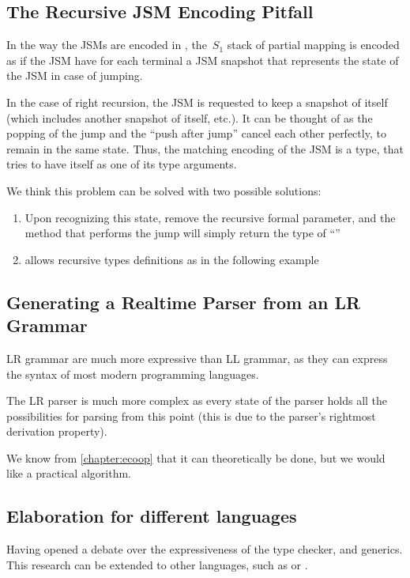 \subsection{The Recursive JSM Encoding Pitfall}
In the way the JSMs are encoded in \Java, the~$S_1$ stack of partial mapping
is encoded as if the JSM have for each terminal a JSM snapshot that represents
the state of the JSM in case of jumping. 

In the case of right recursion, the JSM is requested to keep a snapshot of
itself (which includes another snapshot of itself, etc.).  It can be thought of
as the popping of the jump and the ``push after jump'' cancel each other
perfectly, to remain in the same state.  Thus, the matching encoding of the JSM
is a type, that tries to have itself as one of its type arguments.

We think this problem can be solved with two possible solutions:
\begin{enumerate}
  \item Upon recognizing this state, remove the recursive formal parameter, and the method
    that performs the jump will simply return the type of ``''
  \item \Java allows recursive types definitions as in the following example 
    \begin{quote}
    \end{quote}
\end{enumerate}

\subsection{Generating a Realtime Parser from an LR Grammar}
LR grammar are much more expressive than LL grammar, as they 
can express the syntax of most modern programming languages.

The LR parser is much more complex as every state of the parser holds all the
possibilities for parsing from this point (this is due to the parser's rightmost
derivation property).

We know from \cref{chapter:ecoop} that it can theoretically be done,
but we would like a practical algorithm.

\subsection{Elaboration for different languages}
Having opened a debate over the expressiveness of the \Java type checker,
  and \Java generics. This research can be extended to other languages,
  such as \CSharp or \Scala.
